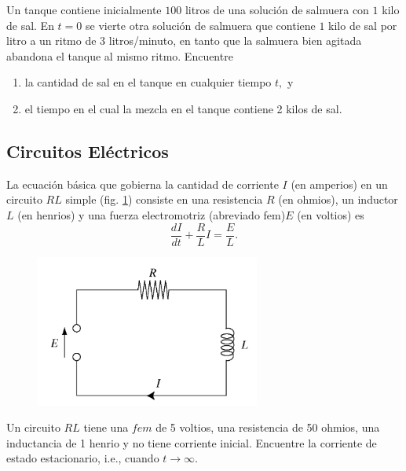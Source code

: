 	\begin{resuelto}
		\label{bron:exmp:7.17}
		Un tanque contiene inicialmente $100$ litros de una solución de salmuera con $1$ kilo de sal. En $t=0$ se vierte otra solución de salmuera que contiene $1$ kilo de sal por litro a un ritmo de $3$ litros/minuto, en tanto que la salmuera bien agitada abandona el tanque al mismo ritmo. Encuentre
		\begin{enumerate}
			\item la cantidad de sal en el tanque en cualquier tiempo $t,$ y
			\item el tiempo en el cual la mezcla en el tanque contiene 2 kilos de sal.
		\end{enumerate}

	\end{resuelto}







\subsection{Circuitos Eléctricos}


	La ecuación básica que gobierna la cantidad de corriente $I$ (en amperios) en un circuito $RL$ simple (fig. \ref{fig:020502}) consiste en una resistencia $R$ (en ohmios), un inductor $L$ (en henrios) y una fuerza electromotriz (abreviado fem)$E$ (en voltios) es
	\[
		\label{bron:7.9}
		\dfrac{dI}{dt}+\dfrac{R}{L}I=\dfrac{E}{L}.
	\]




	\begin{figure}
		\centering
		\includegraphics[height=5cm,keepaspectratio=true]{./edo/img020502.png}
		\label{fig:020502}
	\end{figure}




	\begin{resuelto}
		Un circuito $RL$ tiene una $fem$ de 5 voltios, una resistencia de 50 ohmios, una inductancia de 1 henrio y no tiene corriente inicial. Encuentre la corriente de estado estacionario, i.e., cuando $t\to \infty.$
	\end{resuelto}




